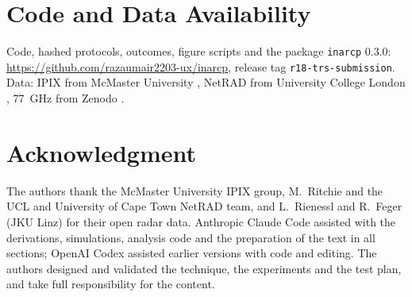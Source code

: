 \documentclass[journal]{IEEEtran}
\begin{document}
\section*{Code and Data Availability}
Code, hashed protocols, outcomes, figure scripts and the package \texttt{inarcp} 0.3.0: \url{https://github.com/razaumair2203-ux/inarcp}, release tag \texttt{r18-trs-submission}. Data: IPIX from McMaster University \cite{ipixweb}, NetRAD from University College London \cite{netrad2026}, 77~GHz from Zenodo \cite{jku2026}.

\section*{Acknowledgment}
The authors thank the McMaster University IPIX group, M.~Ritchie and the UCL and University of Cape Town NetRAD team, and L.~Rienessl and R.~Feger (JKU Linz) for their open radar data. Anthropic Claude Code assisted with the derivations, simulations, analysis code and the preparation of the text in all sections; OpenAI Codex assisted earlier versions with code and editing. The authors designed and validated the technique, the experiments and the test plan, and take full responsibility for the content.



\end{document}
